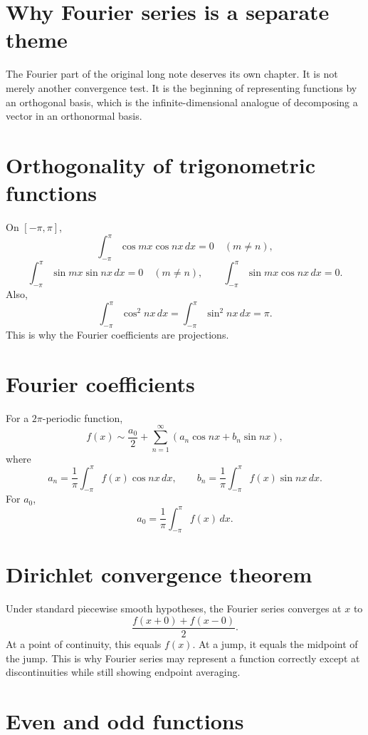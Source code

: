 
\section{Why Fourier series is a separate theme}

The Fourier part of the original long note deserves its own chapter.  It is not merely another convergence test.  It is the beginning of representing functions by an orthogonal basis, which is the infinite-dimensional analogue of decomposing a vector in an orthonormal basis.

\section{Orthogonality of trigonometric functions}

On $[-\pi,\pi]$,
\[
  \int_{-\pi}^{\pi}\cos mx\cos nx\,dx=0\quad(m\ne n),
\]
\[
  \int_{-\pi}^{\pi}\sin mx\sin nx\,dx=0\quad(m\ne n),\qquad
  \int_{-\pi}^{\pi}\sin mx\cos nx\,dx=0.
\]
Also,
\[
  \int_{-\pi}^{\pi}\cos^2 nx\,dx=\int_{-\pi}^{\pi}\sin^2 nx\,dx=\pi.
\]
This is why the Fourier coefficients are projections.

\section{Fourier coefficients}

For a $2\pi$-periodic function,
\[
  f(x)\sim \frac{a_0}{2}+\sum_{n=1}^{\infty}(a_n\cos nx+b_n\sin nx),
\]
where
\[
  a_n=\frac1\pi\int_{-\pi}^{\pi}f(x)\cos nx\,dx,\qquad
  b_n=\frac1\pi\int_{-\pi}^{\pi}f(x)\sin nx\,dx.
\]
For $a_0$,
\[
  a_0=\frac1\pi\int_{-\pi}^{\pi}f(x)\,dx.
\]

\section{Dirichlet convergence theorem}

Under standard piecewise smooth hypotheses, the Fourier series converges at $x$ to
\[
  \frac{f(x+0)+f(x-0)}2.
\]
At a point of continuity, this equals $f(x)$.  At a jump, it equals the midpoint of the jump.  This is why Fourier series may represent a function correctly except at discontinuities while still showing endpoint averaging.

\section{Even and odd functions}

